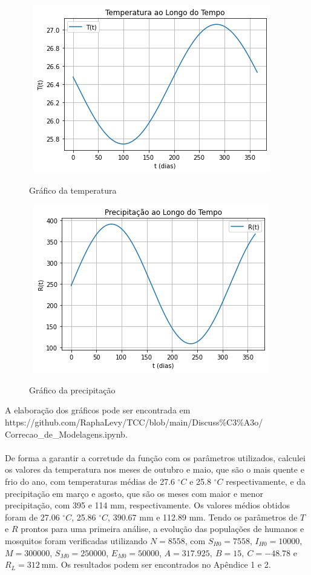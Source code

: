 \documentclass[12pt]{article}
\begin{document}
\begin{figure}[!ht]
        \centering
        \hbox{\hspace{7.0em} \includegraphics[scale=0.6] {Grafico_da_Temperatura.png}}
        \caption{Gráfico da temperatura}
\end{figure} 
\newpage
\begin{figure}[!ht]
        \centering
        \hbox{\hspace{7.0em} \includegraphics[scale=0.6] {Grafico_da_Precipitacao.png}}
        \caption{Gráfico da precipitação}
\end{figure} 
A elaboração dos gráficos pode ser encontrada em
\\
https://github.com/RaphaLevy/TCC/blob/main/Discuss\%C3\%A3o/
\\
Correcao\_de\_Modelagens.ipynb.
\\\\
De forma a garantir a corretude da função com os parâmetros utilizados, calculei os valores da temperatura nos meses de outubro e maio, que são o mais quente e frio do ano, com temperaturas médias de 27.6 $^\circ C$ e 25.8 $^\circ C$ respectivamente, e da precipitação em março e agosto, que são os meses com maior e menor precipitação, com 395 e 114 mm, respectivamente. Os valores médios obtidos foram de 27.06 $^\circ C$, 25.86 $^\circ C$, 390.67 mm e 112.89 mm. Tendo os parâmetros de $T$ e $R$ prontos para uma primeira análise, a evolução das populações de humanos e mosquitos foram verificadas utilizando $N=8558$, com $S_{H0} = 7558$, $I_{H0} = 10000$, $M= 300000$, $S_{M0}=250000$, $E_{M0} = 50000$, $A = 317.925, \ B = 15, \ C = -48.78$ e $R_L = 312 \ \text{mm}$. Os resultados podem ser encontrados no Apêndice 1 e 2.
\end{document}
